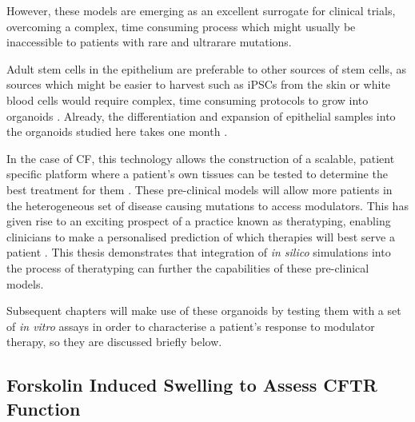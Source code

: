 However, these models are emerging as an excellent surrogate for clinical trials, overcoming a complex, time consuming process \cite{pranke2019a} which might usually be inaccessible to patients with rare and ultrarare mutations. 

Adult stem cells in the epithelium are preferable to other sources of stem cells, as sources which might be easier to harvest such as iPSCs from the skin or white blood cells would require complex, time consuming protocols to grow into organoids \cite{wong2012}. Already, the differentiation and expansion of epithelial samples into the organoids studied here takes one month \cite{sato2011}.

In the case of CF, this technology allows the construction of a scalable, patient specific platform where a patient's own tissues can be tested to determine the best treatment for them \cite{keegan2021, sato2011}. These pre-clinical models will allow more patients in the heterogeneous set of disease causing mutations to access modulators. This has given rise to an exciting prospect of a practice known as theratyping, enabling clinicians to make a personalised prediction of which therapies will best serve a patient \cite{clancy2019, wong2022, wong2022a, ciciriello2022}. This thesis demonstrates that integration of \textit{in silico} simulations into the process of theratyping can further the capabilities of these pre-clinical models.

Subsequent chapters will make use of these organoids by testing them with a set of \textit{in vitro} assays in order to characterise a patient's response to modulator therapy, so they are discussed briefly below.

\subsection{Forskolin Induced Swelling to Assess CFTR Function}

